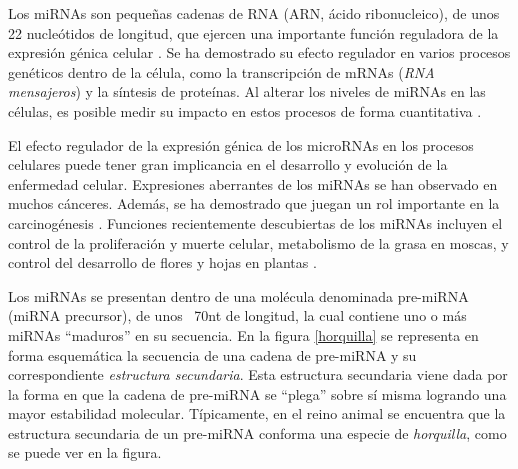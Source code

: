 \documentclass[12pt,bibliography=openstyle,DIV=12,parskip=full-]{scrartcl}
\begin{document}
Los miRNAs son pequeñas cadenas de RNA (ARN, ácido ribonucleico), de
unos 22 nucleótidos de longitud, que ejercen una importante función
reguladora de la expresión génica celular \cite{bartel116}.  Se ha
demostrado su efecto regulador en varios procesos genéticos dentro de
la célula, como la transcripción de mRNAs (\emph{RNA mensajeros}) y la
síntesis de proteínas. Al alterar los niveles de miRNAs en las
células, es posible medir su impacto en estos procesos de forma
cuantitativa \cite{lili}.

El efecto regulador de la expresión génica de los microRNAs en los
procesos celulares puede tener gran implicancia en el desarrollo y
evolución de la enfermedad celular. Expresiones aberrantes de los
miRNAs se han observado en muchos cánceres. Además, se ha demostrado
que juegan un rol importante en la carcinogénesis \cite{lili}. 
Funciones recientemente descubiertas de los miRNAs incluyen el control
de la proliferación y muerte celular, metabolismo de la grasa en
moscas, y control del desarrollo de flores y hojas en
plantas \cite{bartel116}. 

\newpage
Los miRNAs se presentan dentro de una molécula denominada pre-miRNA
(miRNA precursor), de unos ~70nt de longitud, la cual contiene uno o
más miRNAs ``maduros'' en su secuencia.  En la figura \ref{horquilla}
se representa en forma esquemática la secuencia de una cadena de
pre-miRNA y su correspondiente \emph{estructura secundaria}. Esta
estructura secundaria viene dada por la forma en que la cadena de
pre-miRNA se ``plega'' sobre sí misma logrando una mayor estabilidad
molecular. Típicamente, en el reino animal se encuentra que la
estructura secundaria de un pre-miRNA conforma una especie de
\emph{horquilla}, como se puede ver en la figura.
\cite{bartel116}\cite{sewer}
\end{document}

